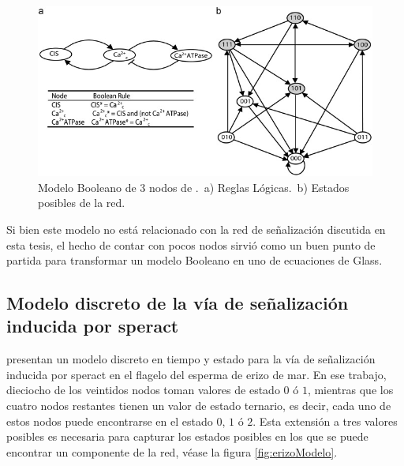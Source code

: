 \begin{figure}[hbt]
\includegraphics[width=0.9\linewidth]{gfx/red3nodos}
\caption[Modelo Booleano de 3 nodos]{Modelo Booleano de 3 nodos de \citeauthor{Reka3Nodos2010} \citep{Reka3Nodos2010}.\ a) Reglas L\'ogicas.\ b) Estados posibles de la red.}\label{fig:red3reka}
\end{figure}


Si bien este modelo no está relacionado con la red de señalización discutida en esta tesis, el hecho de contar con pocos nodos sirvió como un buen punto de partida para transformar un modelo Booleano en uno de ecuaciones de Glass.

\subsection{Modelo discreto de la vía de señalización inducida por speract}\label{sect:erizo}


\citeauthor{Espinal2011} \citep{Espinal2011} presentan un modelo discreto en tiempo y estado para la vía de señalización inducida por speract en el flagelo del esperma de erizo de mar. En ese trabajo, dieciocho de los veintidos nodos toman valores de estado $0$ ó $1$, mientras que los cuatro nodos restantes tienen un valor de estado ternario, es decir, cada uno de estos nodos puede encontrarse en el estado $0$, $1$ ó $2$. Esta extensión a tres valores posibles es necesaria para capturar los estados posibles en los que se puede encontrar un componente de la red, véase la figura \ref{fig:erizoModelo}.


